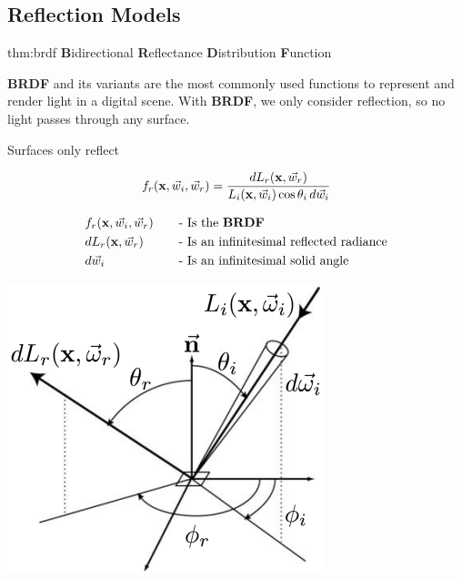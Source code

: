 \documentclass{article}
\begin{document}
\newpage

\subsection{Reflection Models}

\begin{defin}[BRDF]{thm:brdf}
    \textbf{B}idirectional \textbf{R}eflectance \textbf{D}istribution \textbf{F}unction

    \vspace{5px}

    \textbf{BRDF} and its variants are the most commonly used functions to represent and render light
    in a digital scene. With \textbf{BRDF}, we only consider reflection, so no light passes through any
    surface.

    \vspace{5px}

    Surfaces only reflect

    \begin{minipage}{0.5\textwidth}
        \[
            f_r(\text{\textbf{x}}, \vec{w}_i, \vec{w}_r) = \frac{d L_r(\text{\textbf{x}}, \vec{w}_r)}
            {L_i(\text{\textbf{x}}, \vec{w}_i) \cos \theta_i \, d\vec{w}_i}
        \]

        \vspace{5px}

        \begin{alignat*}{2}
            &f_r(\text{\textbf{x}}, \vec{w}_i, \vec{w}_r) \quad &&\text{- Is the \textbf{BRDF}}\\
            &d L_r(\text{\textbf{x}}, \vec{w}_r) &&\text{- Is an infinitesimal reflected radiance}\\
            &d \vec{w}_i &&\text{- Is an infinitesimal solid angle}
        \end{alignat*}
    \end{minipage}
    \begin{minipage}{0.4\textwidth}
        \raggedleft
        \includegraphics[width=0.8\linewidth]{images/brdf_explanation.png}
    \end{minipage}
\end{defin}
\end{document}
